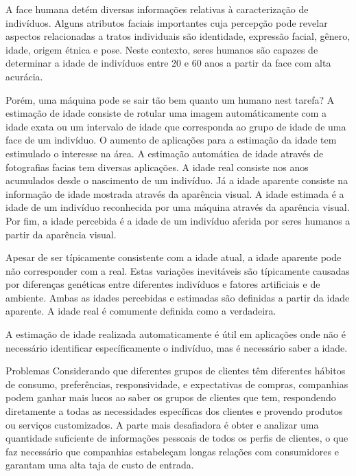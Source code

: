 
A face humana detém diversas informações relativas à caracterização de indivíduos. Alguns atributos faciais importantes cuja percepção pode revelar aspectos relacionadas a tratos individuais são identidade, expressão facial, gênero, idade, origem étnica e pose. Neste contexto, seres humanos são capazes de determinar a idade de indivíduos entre 20 e 60 anos a partir da face com alta acurácia.

Porém, uma máquina pode se sair tão bem quanto um humano nest tarefa?
A estimação de idade consiste de rotular uma imagem automáticamente com a idade exata ou um intervalo de idade que corresponda ao grupo de idade de uma face de um indivíduo.
O aumento de aplicações para a estimação da idade tem estimulado o interesse na área.
A estimação automática de idade através de fotografias facias tem diversas aplicações.
A idade real consiste nos anos acumulados desde o nascimento de um indivíduo. Já a idade aparente consiste na informação de idade mostrada através da aparência visual. A idade estimada é a idade de um indivíduo reconhecida por uma máquina através da aparência visual. Por fim, a idade percebida é a idade de um indivíduo aferida por seres humanos a partir da aparência visual.

Apesar de ser típicamente consistente com a idade atual, a idade aparente pode não corresponder com a real. Estas variações inevitáveis são típicamente causadas por diferenças genéticas  entre diferentes indivíduos e fatores artificiais e de ambiente. Ambas as idades percebidas e estimadas são definidas a partir da idade aparente. A idade real é comumente definida como a verdadeira.

A estimação de idade realizada automaticamente é útil em aplicações onde não é necessário identificar específicamente o indivíduo, mas é necessário saber a idade.

Problemas
Considerando que diferentes grupos de clientes têm diferentes hábitos de consumo, preferências, responsividade, e expectativas de compras, companhias podem ganhar mais lucos ao saber os grupos de clientes que tem, respondendo diretamente a todas as necessidades específicas dos clientes e provendo produtos ou serviços customizados. A parte mais desafiadora é obter e analizar uma quantidade suficiente de informações pessoais de todos os perfis de clientes, o que faz necessário que companhias estabeleçam longas relações com consumidores e garantam uma alta taja de custo de entrada.

